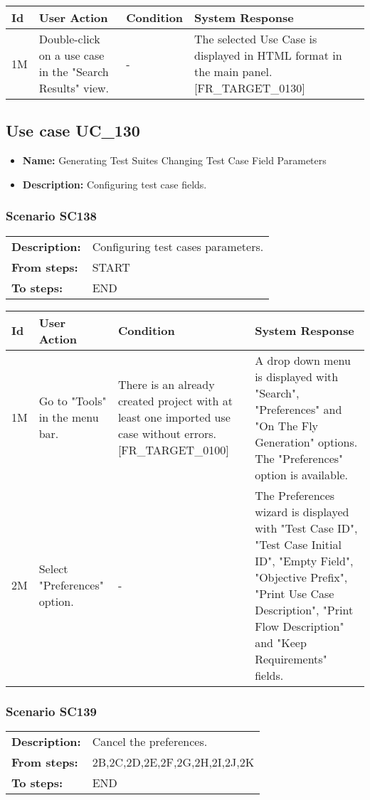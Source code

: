 \documentclass[a4paper,11pt]{article}
\newcommand{\bl}{\\ \hline}
\begin{document}
\begin{tabular}{|p{0.8in}|p{1.6in}|p{1.6in}|p{1.6in}|}
\hline
Id & User Action & Condition & System Response  \bl 
1M & Double-click on a use case in the "Search Results" view.
					 & - & The selected Use Case is displayed in HTML format in the
						main panel. [FR_TARGET_0130]  \bl 
\end{tabular}
\subsection*{Use case UC_130}
\begin{itemize}
\item {\bf Name: }Generating Test Suites Changing Test Case Field Parameters
			
\item {\bf Description: }Configuring test case fields.
\end{itemize}
\subsubsection*{Scenario SC138}
\begin{tabular}{p{1in}p{4in}}
{\bf Description:} & Configuring test cases parameters. \\
{\bf From steps:} & START \\
{\bf To steps:} & END \\
\end{tabular}
 
\begin{tabular}{|p{0.8in}|p{1.6in}|p{1.6in}|p{1.6in}|}
\hline
Id & User Action & Condition & System Response  \bl 
1M & Go to "Tools" in the menu bar.  & There is an already created project with at least one
						imported use case without errors. [FR_TARGET_0100] & A drop down menu is displayed with "Search",
						"Preferences" and "On The Fly Generation" options. The
						"Preferences" option is available. \bl 
2M & Select "Preferences" option. & - & The Preferences wizard is displayed with "Test Case ID",
						"Test Case Initial ID", "Empty Field", "Objective Prefix", "Print
						Use Case Description", "Print Flow Description" and "Keep
						Requirements" fields. \bl 
\end{tabular}
\subsubsection*{Scenario SC139}
\begin{tabular}{p{1in}p{4in}}
{\bf Description:} & Cancel the preferences. \\
{\bf From steps:} & 2B,2C,2D,2E,2F,2G,2H,2I,2J,2K \\
{\bf To steps:} & END \\
\end{tabular}
 
\end{document}
